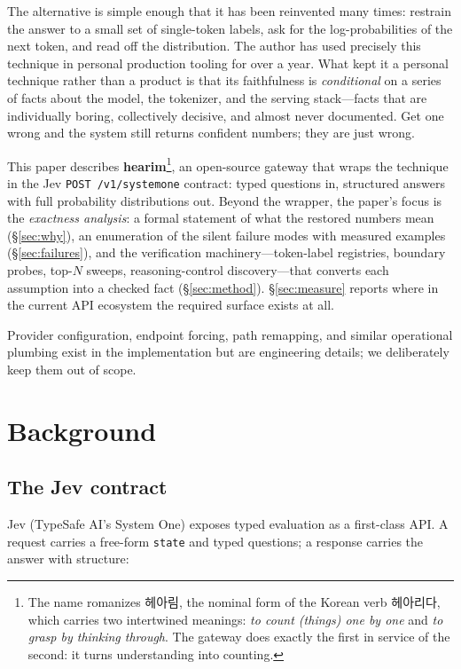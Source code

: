 \documentclass[11pt]{article}
\begin{document}
The alternative is simple enough that it has been reinvented many times:
restrain the answer to a small set of single-token labels, ask for the
log-probabilities of the next token, and read off the distribution. The
author has used precisely this technique in personal production tooling for
over a year. What kept it a personal technique rather than a product is
that its faithfulness is \emph{conditional} on a series of facts about the
model, the tokenizer, and the serving stack---facts that are individually
boring, collectively decisive, and almost never documented. Get one wrong
and the system still returns confident numbers; they are just wrong.

This paper describes \textbf{hearim}\footnote{The name romanizes 헤아림, the
nominal form of the Korean verb 헤아리다, which carries two intertwined
meanings: \emph{to count (things) one by one} and \emph{to grasp by thinking
through}. The gateway does exactly the first in service of the second: it
turns understanding into counting.}, an open-source gateway that wraps the
technique in the Jev \texttt{POST /v1/systemone} contract: typed questions
in, structured answers with full probability distributions out. Beyond the
wrapper, the paper's focus is the \emph{exactness analysis}: a formal
statement of what the restored numbers mean (\S\ref{sec:why}), an
enumeration of the silent failure modes with measured examples
(\S\ref{sec:failures}), and the verification machinery---token-label
registries, boundary probes, top-$N$ sweeps, reasoning-control
discovery---that converts each assumption into a checked fact
(\S\ref{sec:method}). \S\ref{sec:measure} reports where in the current API
ecosystem the required surface exists at all.

Provider configuration, endpoint forcing, path remapping, and similar
operational plumbing exist in the implementation but are engineering
details; we deliberately keep them out of scope.

\section{Background}

\subsection{The Jev contract}

Jev (TypeSafe AI's System One) exposes typed evaluation as a first-class
API. A request carries a free-form \texttt{state} and typed questions; a
response carries the answer with structure:
\end{document}
